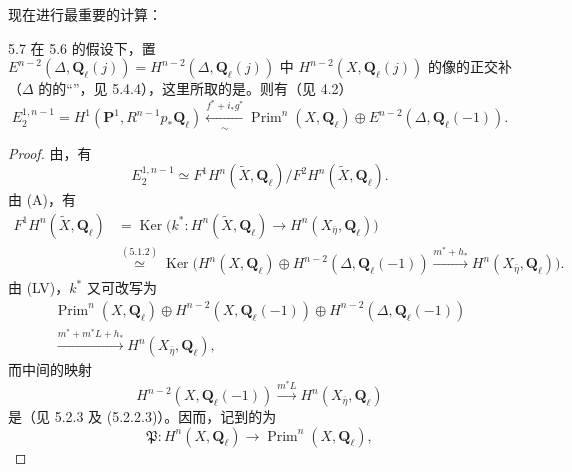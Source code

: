 现在进行最重要的计算：
\begin{SGAresult}{}{5.7}
在 5.6 的假设下，置
\[E^{n-2}(\Delta,\mathbf Q_\ell(j))=\text{$H^{n-2}(\Delta,\mathbf Q_\ell(j))$ 中 $H^{n-2}(X,\mathbf Q_\ell(j))$ 的像的正交补}\]
（$\Delta$ 的的“”，见 5.4.4），这里所取的是。则有（见 4.2）
\begin{equation}\tag{5.7.1}E_2^{1,n-1}=H^1(\mathbf P^1,R^{n-1}p_*\mathbf Q_\ell)\xleftarrow[\sim]{f^*+i_*g^*}\operatorname{Prim}^n(X,\mathbf Q_\ell)\oplus E^{n-2}(\Delta,\mathbf Q_\ell(-1)).\end{equation}
\end{SGAresult}
\begin{proof}
由，有
\[E_2^{1,n-1}\simeq F^1H^n(\widetilde X,\mathbf Q_\ell)/F^2H^n(\widetilde X,\mathbf Q_\ell).\]
由 (A)，有
\begin{equation}\tag{5.7.2}\begin{aligned}
F^1H^n(\widetilde X,\mathbf Q_\ell)&=\operatorname{Ker}\bigl(k^*:H^n(\widetilde X,\mathbf Q_\ell)\to H^n(X_{\bar\eta},\mathbf Q_\ell)\bigr)\\
&\overset{(5.1.2)}\simeq\operatorname{Ker}\bigl(H^n(X,\mathbf Q_\ell)\oplus H^{n-2}(\Delta,\mathbf Q_\ell(-1))\xrightarrow{m^*+h_*}H^n(X_{\bar\eta},\mathbf Q_\ell)\bigr).
\end{aligned}\end{equation}
由 (LV)，$k^*$ 又可改写为
\begin{equation}\tag{5.7.3}\begin{gathered}
\operatorname{Prim}^n(X,\mathbf Q_\ell)\oplus H^{n-2}(X,\mathbf Q_\ell(-1))\oplus H^{n-2}(\Delta,\mathbf Q_\ell(-1))\\
\xrightarrow{m^*+m^*L+h_*}H^n(X_{\bar\eta},\mathbf Q_\ell),
\end{gathered}\end{equation}
而中间的映射
\begin{equation}\tag{5.7.4}H^{n-2}(X,\mathbf Q_\ell(-1))\xrightarrow{m^*L}H^n(X_{\bar\eta},\mathbf Q_\ell)\end{equation}
是（见 5.2.3 及 (5.2.2.3)）。因而，记到的为
\begin{equation}\tag{5.7.5}\mathfrak P:H^n(X,\mathbf Q_\ell)\longrightarrow\operatorname{Prim}^n(X,\mathbf Q_\ell),\end{equation}

\end{proof}
